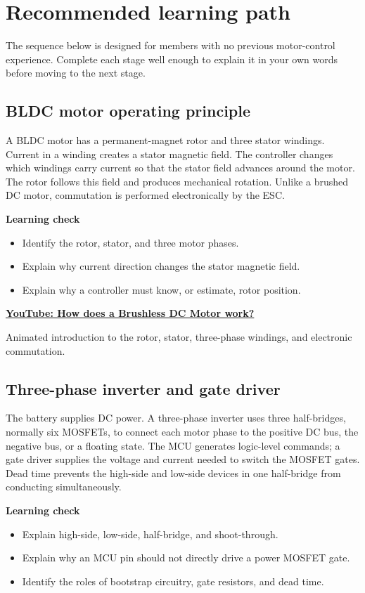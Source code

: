 \documentclass[11pt,a4paper]{article}
\newcommand{\Resource}[3]{%
  \begin{resourcebox}
    \href{#2}{\textbf{\color{DARESTeal}#1}}\par
    {\small #3}
  \end{resourcebox}
}
\begin{document}
\section{Recommended learning path}

The sequence below is designed for members with no previous motor-control
experience. Complete each stage well enough to explain it in your own words
before moving to the next stage.

\subsection{BLDC motor operating principle}

A BLDC motor has a permanent-magnet rotor and three stator windings. Current
in a winding creates a stator magnetic field. The controller changes which
windings carry current so that the stator field advances around the motor.
The rotor follows this field and produces mechanical rotation. Unlike a
brushed DC motor, commutation is performed electronically by the ESC.

\textbf{Learning check}
\begin{itemize}
  \item Identify the rotor, stator, and three motor phases.
  \item Explain why current direction changes the stator magnetic field.
  \item Explain why a controller must know, or estimate, rotor position.
\end{itemize}

\Resource
  {YouTube: How does a Brushless DC Motor work?}
  {https://www.youtube.com/watch?v=Hw1q-jbhPzc}
  {Animated introduction to the rotor, stator, three-phase windings, and electronic commutation.}

\subsection{Three-phase inverter and gate driver}

The battery supplies DC power. A three-phase inverter uses three
half-bridges, normally six MOSFETs, to connect each motor phase to the
positive DC bus, the negative bus, or a floating state. The MCU generates
logic-level commands; a gate driver supplies the voltage and current needed
to switch the MOSFET gates. Dead time prevents the high-side and low-side
devices in one half-bridge from conducting simultaneously.

\textbf{Learning check}
\begin{itemize}
  \item Explain high-side, low-side, half-bridge, and shoot-through.
  \item Explain why an MCU pin should not directly drive a power MOSFET gate.
  \item Identify the roles of bootstrap circuitry, gate resistors, and dead time.
\end{itemize}
\end{document}
